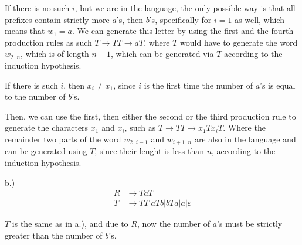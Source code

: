 If there is no such $i$, but we are in the language, the only possible way is that all prefixes contain strictly more $a$'s, then $b$'s, specifically for $i=1$ as well, which means that $w_1 = a$. We can generate this letter by using the first and the fourth production rules as such $T \rightarrow TT \rightarrow aT$, where $T$ would have to generate the word $w_{2..n}$, which is of length $n-1$, which can be generated via $T$ according to the induction hypothesis.

If there is such $i$, then $x_i\neq{}x_1$, since $i$ is the first time the number of $a$'s is equal to the number of $b$'s.

Then, we can use the first, then either the second or the third production rule to generate the characters $x_1$ and $x_i$, such as $T \rightarrow TT \rightarrow x_1Tx_iT$. Where the remainder two parts of the word $w_{2..i-1}$ and $w_{i+1..n}$ are also 
in the language and can be generated using $T$, since their lenght is less than $n$, according to the induction hypothesis.

b.)
\begin{align*}
R &\rightarrow TaT\\
T &\rightarrow TT | aTb | bTa | a | \varepsilon
\end{align*}

$T$ is the same as in a.), and due to $R$, now the number of $a$'s must be strictly greater than the number of $b$'s.